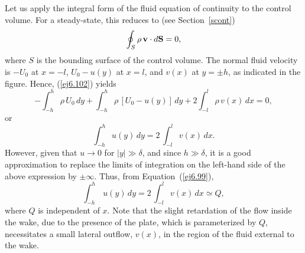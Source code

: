 Let us apply the integral form of the fluid equation of continuity to the control volume. For a
 steady-state, this reduces to (see Section~\ref{scont})
 \begin{equation}\label{ej6.102}
 \oint_S \rho\,{\bf v}\cdot d{\bf S}=0,
 \end{equation}
 where $S$ is the bounding surface of the control volume.
 The normal fluid velocity is $-U_0$ at $x=-l$,
$U_0-u(y)$ at $x=l$, and $v(x)$ at $y=\pm h$, as indicated in the figure. 
Hence, (\ref{ej6.102}) yields
\begin{equation}
-\int_{-h}^h\rho\,U_0\,dy + \int_{-h}^{h}\rho\,[U_0-u(y)]\,dy+2\int_{-l}^{l}\rho\,v(x)\,dx = 0,
\end{equation}
or 
\begin{equation}\label{ej6.104}
\int_{-h}^h u(y)\,dy = 2\,\int_{-l}^l v(x)\,dx.
\end{equation}
However, given that $u\rightarrow 0$ for $|y|\gg\delta$, and since $h\gg \delta$, it is a good approximation to replace the limits of integration on the left-hand side of the
above expression  by $\pm \infty$. Thus, from  Equation~(\ref{ej6.99}), 
\begin{equation}\label{ej6.104a}
\int_{-h}^h\,u(y)\,dy=2\,\int_{-l}^lv(x)\,dx \simeq Q,
\end{equation}
where $Q$ is independent of $x$.
Note that the slight retardation of the flow inside the wake, due  to the presence of the plate, which is parameterized by $Q$,
necessitates a small lateral outflow, $v(x)$,   in the region of the fluid external to the wake. 

